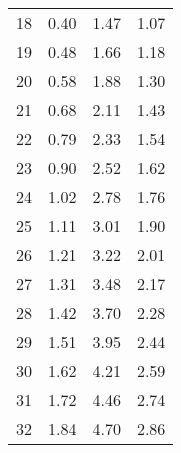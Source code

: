 \begin{longtable}[c]{cccc}
	18                       & 0.40                                 & 1.47                                 & 1.07                       \\
	19                       & 0.48                                 & 1.66                                 & 1.18                       \\
	20                       & 0.58                                 & 1.88                                 & 1.30                       \\
	21                       & 0.68                                 & 2.11                                 & 1.43                       \\
	22                       & 0.79                                 & 2.33                                 & 1.54                       \\
	23                       & 0.90                                 & 2.52                                 & 1.62                       \\
	24                       & 1.02                                 & 2.78                                 & 1.76                       \\
	25                       & 1.11                                 & 3.01                                 & 1.90                       \\
	26                       & 1.21                                 & 3.22                                 & 2.01                       \\
	27                       & 1.31                                 & 3.48                                 & 2.17                       \\
	28                       & 1.42                                 & 3.70                                 & 2.28                       \\
	29                       & 1.51                                 & 3.95                                 & 2.44                       \\
	30                       & 1.62                                 & 4.21                                 & 2.59                       \\
	31                       & 1.72                                 & 4.46                                 & 2.74                       \\
	32                       & 1.84                                 & 4.70                                 & 2.86                       \\

\end{longtable}
